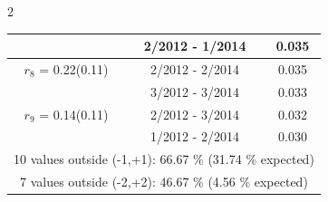 \begin{multicols}{2}
{\begin{tabular}{ccc}
&        2/2012 -  1/2014 &        0.035  \vspace{-.02in} \\ \hline 
  $r_{ 8}$ = 0.22(0.11) &       2/2012 -  2/2014 &        0.035   \vspace{-.10in} \\  
&        3/2012 -  3/2014 &        0.033  \vspace{-.02in} \\ \hline 
  $r_{ 9}$ = 0.14(0.11) &       2/2012 -  3/2014 &        0.032   \vspace{-.10in} \\  
&        1/2012 -  2/2014 &        0.030  \vspace{-.02in} \\ \hline 
\multicolumn{3}{c}{              10 values outside (-1,+1): 66.67  \% (31.74  \% expected)}\vspace{-.10in} \\ 
\multicolumn{3}{c}{               7 values outside (-2,+2): 46.67 \%  (4.56 \% expected) } \\
 \end{tabular} \\ 
 } 
\end{multicols} 
